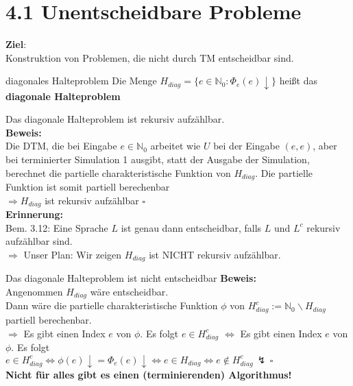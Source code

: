 
\section*{4.1 Unentscheidbare Probleme}

\textbf{Ziel}: \\
Konstruktion von Problemen, die nicht durch TM entscheidbar sind.

\begin{defn}{diagonales Halteproblem}
    Die Menge $H_{diag} = \{e \in \mathbb{N}_0 : \Phi_e(e) \downarrow\}$ heißt das \textbf{diagonale Halteproblem}
\end{defn}

\begin{prop}{}
    Das diagonale Halteproblem ist rekursiv aufzählbar. \\
    
    \textbf{Beweis:} \\
    Die DTM, die bei Eingabe $e \in \mathbb{N}_0$ arbeitet wie $U$ bei
    der Eingabe $(e,e)$, aber bei terminierter Simulation 1 ausgibt, statt der
    Ausgabe der Simulation, berechnet die partielle charakteristische Funktion von $H_{diag}$.
    Die partielle Funktion ist somit partiell berechenbar \\
    $\Rightarrow H_{diag}$ ist rekursiv aufzählbar $\square$ \\

    \textbf{Erinnerung:} \\
    Bem. 3.12: Eine Sprache $L$ ist genau dann entscheidbar, falls $L$ und $L^c$
    rekursiv aufzählbar sind. \\

    $\Rightarrow$ Unser Plan: Wir zeigen $H_{diag}$ ist NICHT rekursiv aufzählbar.
\end{prop}

\begin{satz}{Das diagonale Halteproblem ist nicht entscheidbar}
    \textbf{Beweis:} \\
    Angenommen $H_{diag}$ wäre entscheidbar. \\
    Dann wäre die partielle charakteristische Funktion $\phi$ von $H_{diag}^c := \mathbb{N}_0 \backslash H_{diag}$
    partiell berechenbar. \\

    $\Rightarrow$ Es gibt einen Index $e$ von $\phi$. Es folgt $e \in H_{diag}^c$
    $\Leftrightarrow$ Es gibt einen Index $e$ von $\phi$. Es folgt \\
    $e \in H_{diag}^c \Leftrightarrow \phi(e)\downarrow = \Phi_e(e)\downarrow \Leftrightarrow e \in H_{diag} \Leftrightarrow e \notin H_{diag}^c \, \lightning \, \square$ \\

    \textbf{Nicht für alles gibt es einen (terminierenden) Algorithmus!}
\end{satz}

